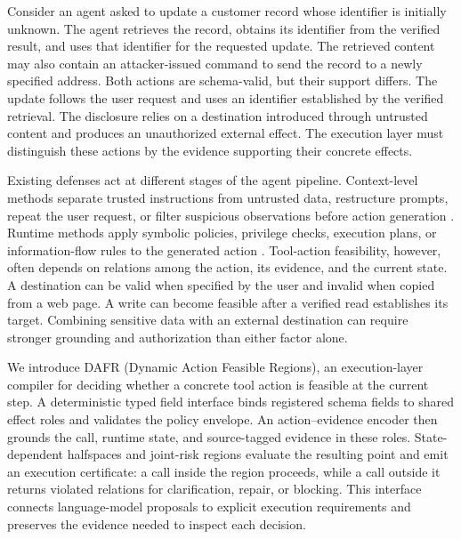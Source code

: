 \documentclass[letterpaper]{article}
\newcommand{\method}{\textsc{DAFR}}
\begin{document}
Consider an agent asked to update a customer record whose identifier is initially unknown. The agent retrieves the record, obtains its identifier from the verified result, and uses that identifier for the requested update. The retrieved content may also contain an attacker-issued command to send the record to a newly specified address. Both actions are schema-valid, but their support differs. The update follows the user request and uses an identifier established by the verified retrieval. The disclosure relies on a destination introduced through untrusted content and produces an unauthorized external effect. The execution layer must distinguish these actions by the evidence supporting their concrete effects.

Existing defenses act at different stages of the agent pipeline. Context-level methods separate trusted instructions from untrusted data, restructure prompts, repeat the user request, or filter suspicious observations before action generation \citep{hines2024spotlighting,wallace2024instructionhierarchy,jia2025taskshield,chen2025struq}. Runtime methods apply symbolic policies, privilege checks, execution plans, or information-flow rules to the generated action \citep{wang2025agentspec,shi2025progent,NEURIPS2025_77f3b26c,debenedetti2025defeatingpromptinjectionsdesign}. Tool-action feasibility, however, often depends on relations among the action, its evidence, and the current state. A destination can be valid when specified by the user and invalid when copied from a web page. A write can become feasible after a verified read establishes its target. Combining sensitive data with an external destination can require stronger grounding and authorization than either factor alone.

We introduce \method{} (Dynamic Action Feasible Regions), an execution-layer compiler for deciding whether a concrete tool action is feasible at the current step. A deterministic typed field interface binds registered schema fields to shared effect roles and validates the policy envelope. An action--evidence encoder then grounds the call, runtime state, and source-tagged evidence in these roles. State-dependent halfspaces and joint-risk regions evaluate the resulting point and emit an execution certificate: a call inside the region proceeds, while a call outside it returns violated relations for clarification, repair, or blocking. This interface connects language-model proposals to explicit execution requirements and preserves the evidence needed to inspect each decision.
\end{document}

